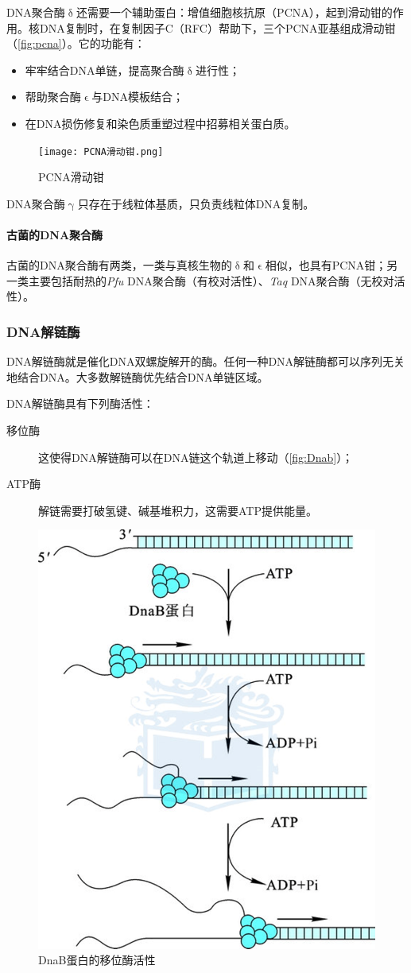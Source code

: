 DNA聚合酶$\updelta$还需要一个辅助蛋白：增值细胞核抗原（PCNA），起到滑动钳的作用。核DNA复制时，在复制因子C（RFC）帮助下，三个PCNA亚基组成滑动钳（\autoref{fig:pcna}）。它的功能有：

\begin{itemize}
	\item 牢牢结合DNA单链，提高聚合酶$\updelta$进行性；
	\item 帮助聚合酶$\upvarepsilon$与DNA模板结合；
	\item 在DNA损伤修复和染色质重塑过程中招募相关蛋白质。
\end{itemize}

\begin{figure}[htbp]
	\centering
	\texttt{[image: PCNA滑动钳.png]}
	\caption{PCNA滑动钳}
	\label{fig:pcna}
\end{figure}

DNA聚合酶$\upgamma$只存在于线粒体基质，只负责线粒体DNA复制。

\paragraph{古菌的DNA聚合酶}

古菌的DNA聚合酶有两类，一类与真核生物的$\updelta$和$\upvarepsilon$相似，也具有PCNA钳；另一类主要包括耐热的\textit{Pfu} DNA聚合酶（有校对活性）、\textit{Taq} DNA聚合酶（无校对活性）。

\subsubsection{DNA解链酶}

DNA解链酶就是催化DNA双螺旋解开的酶。任何一种DNA解链酶都可以序列无关地结合DNA。大多数解链酶优先结合DNA单链区域。

DNA解链酶具有下列酶活性：
\begin{description}
	\item[移位酶] 这使得DNA解链酶可以在DNA链这个轨道上移动（\autoref{fig:Dnab}）；
	\item[ATP酶] 解链需要打破氢键、碱基堆积力，这需要ATP提供能量。
\end{description}

\begin{figure}
	\centering
	\includegraphics[width=0.5\linewidth]{Pics/DnaB}
	\caption{DnaB蛋白的移位酶活性}
	\label{fig:Dnab}
\end{figure}


